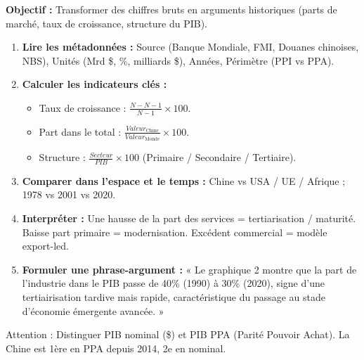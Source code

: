 \documentclass[11pt]{article}
\newcommand{\cle}[1]{{\popxbold\color{popdark}#1}}
\begin{document}
\begin{methode}
\textbf{Objectif :} Transformer des chiffres bruts en arguments historiques (parts de marché, taux de croissance, structure du PIB).
\begin{enumerate}
    \item \textbf{Lire les métadonnées :} Source (Banque Mondiale, FMI, Douanes chinoises, NBS), Unités (Mrd \$, \%, milliards \$), Années, Périmètre (PPI vs PPA).
    \item \textbf{Calculer les indicateurs clés :} 
    \begin{itemize}
        \item Taux de croissance : $\frac{N - N-1}{N-1} \times 100$.
        \item Part dans le total : $\frac{Valeur_{\text{Chine}}}{Valeur_{\text{Monde}}} \times 100$.
        \item Structure : $\frac{Secteur}{PIB} \times 100$ (Primaire / Secondaire / Tertiaire).
    \end{itemize}
    \item \textbf{Comparer dans l'espace et le temps :} Chine vs USA / UE / Afrique ; 1978 vs 2001 vs 2020.
    \item \textbf{Interpréter :} Une hausse de la part des services = tertiarisation / maturité. Baisse part primaire = modernisation. Excédent commercial = modèle export-led.
    \item \textbf{Formuler une phrase-argument :} « Le graphique 2 montre que la part de l'industrie dans le PIB passe de 40\% (1990) à 30\% (2020), signe d'une \cle{tertiairisation} tardive mais rapide, caractéristique du passage au stade d'économie émergente avancée. »
\end{enumerate}
\cle{Attention :} Distinguer PIB nominal (\$) et PIB PPA (Parité Pouvoir Achat). La Chine est 1ère en PPA depuis 2014, 2e en nominal.
\end{methode}
\end{document}
